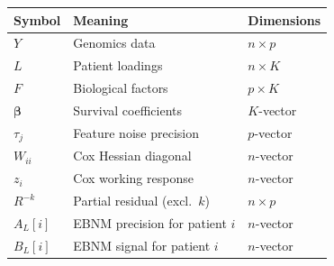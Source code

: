 \documentclass[11pt]{article}
\newcommand{\Rk}[0]{R^{-k}}
\begin{document}
\begin{tabular}{lll}
\toprule
Symbol & Meaning & Dimensions \\
\midrule
$Y$ & Genomics data & $n \times p$ \\
$L$ & Patient loadings & $n \times K$ \\
$F$ & Biological factors & $p \times K$ \\
$\bm{\beta}$ & Survival coefficients & $K$-vector \\
$\tau_j$ & Feature noise precision & $p$-vector \\
$W_{ii}$ & Cox Hessian diagonal & $n$-vector \\
$z_i$ & Cox working response & $n$-vector \\
$\Rk$ & Partial residual (excl.\ $k$) & $n \times p$ \\
$A_L[i]$ & EBNM precision for patient $i$ & $n$-vector \\
$B_L[i]$ & EBNM signal for patient $i$ & $n$-vector \\
\bottomrule
\end{tabular}
\end{document}
